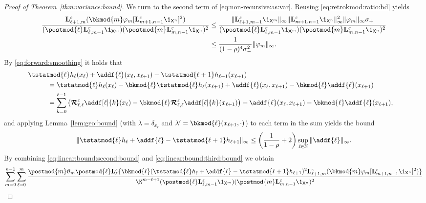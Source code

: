 \begin{proof}[Proof of Theorem~\ref{thm:variance:bound}]
We turn to the second term of \eqref{eq:non-recursive:as:var}. Reusing \eqref{eq:retrokmod:ratio:bd} yields 
\begin{align} 
\frac{\ukmod{\ell + 1, m}( \bkmod{m} \varphi_m [\ukmod{m + 1, n - 1} \1_{\Xset^n}]^2)}{(\postmod{\ell} \ukmod{\ell, m - 1} \1_{\Xset^m})(\postmod{m} \ukmod{m, n - 1} \1_{\Xset^n})^2} 
&\leq \frac{\| \ukmod{\ell + 1, m - 1} \1_{\Xset^m} \|_\infty \|\ukmod{m + 1, n - 1} \1_{\Xset^n} \|_\infty^2 \|\varphi_m \|_\infty \udup}{(\postmod{\ell} \ukmod{\ell, m - 1} \1_{\Xset^m})(\postmod{m} \ukmod{m, n - 1} \1_{\Xset^n})^2} \nonumber \\ 
&\leq \frac{1}{(1 - \rho)^4 \udlow^2} 
\|\varphi_m \|_\infty. \label{eq:linear:bound:second:bound}
\end{align}
By \eqref{eq:forward:smoothing} it holds that  
\begin{align*}
\lefteqn{\tstatmod{\ell} h_{\ell}(x_\ell) + \addf{\ell}(x_\ell, x_{\ell + 1}) - \tstatmod{\ell + 1} h_{\ell +1}(x_{\ell + 1})} \hspace{10mm} \\ 
&= \tstatmod{\ell} h_\ell(x_\ell) - \bkmod{\ell}\tstatmod{\ell} h_\ell(x_{\ell + 1}) + \addf{\ell}(x_\ell, x_{\ell + 1}) - \bkmod{\ell} \addf{\ell}(x_{\ell + 1}) \\
&= \sum_{k = 0}^{\ell - 1} \left( \retrokmodmod_{\ell, \ell} \addf[\ell]{k}(x_\ell) - \bkmod{\ell} \retrokmodmod_{\ell, \ell} \addf[\ell]{k}(x_{\ell + 1}) \right) + \addf{\ell}(x_\ell, x_{\ell + 1}) - \bkmod{\ell} \addf{\ell}(x_{\ell + 1}), 
\end{align*}
and applying Lemma~\ref{lem:geo:bound} (with $\lambda = \delta_{x_\ell}$ and $\lambda' = \bkmod{\ell}(x_{\ell + 1}, \cdot)$) to each term in the sum yields the bound 
\begin{equation} \label{eq:linear:bound:third:bound}
\| \tstatmod{\ell} h_{\ell} + \addf{\ell} - \tstatmod{\ell + 1} h_{\ell +1} \|_\infty \leq \left( \frac{1}{1 - \rho} + 2 \right) \sup_{\ell \in \nset} \|\addf{\ell} \|_\infty. 
\end{equation}
By combining \eqref{eq:linear:bound:second:bound} and \eqref{eq:linear:bound:third:bound} we obtain 
\begin{multline} 
 \sum_{m = 0}^{n - 1} \sum_{\ell = 0}^m \frac{\postmod{m} \adjfuncforward{m} \postmod{\ell} \ukmod{\ell} \{\bkmod{\ell}(\tstatmod{\ell} h_{\ell} + \addf{\ell} - \tstatmod{\ell + 1} h_{\ell +1})^2 \ukmod{\ell + 1, m}( \bkmod{m} \varphi_m [\ukmod{m + 1, n - 1} \1_{\Xset^n}]^2
)\}}{\K^{m - \ell + 1} (\postmod{\ell} \ukmod{\ell, m - 1} \1_{\Xset^m})(\postmod{m} \ukmod{m, n - 1} \1_{\Xset^n})^2} \\

\end{multline}
\end{proof}
